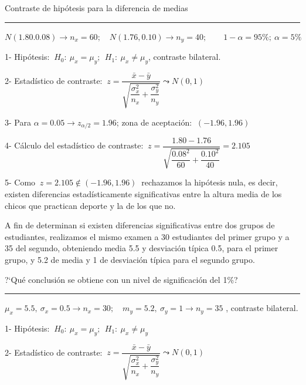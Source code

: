 \begin{myalertblock}{Contraste de hipótesis para la diferencia de medias}
\begin{example}
\rule{150pt}{0.1pt}

\vspace{2mm} $N(1.80.0.08) \to n_x=60;\quad N(1.76,0.10) \to n_y=40;\qquad 1-\alpha=95\%;\ \alpha=5\%$

\vspace{2mm} 1- Hipótesis: $\ H_0:\ \mu_x=\mu_y;\ \ H_1:\ \mu_x \neq \mu_y$, contraste bilateral.

\vspace{2mm} 2- Estadístico de contraste: $\ z=\dfrac{\bar x - \bar y}{\sqrt{\dfrac{\sigma^2_x}{n_x}+\dfrac{\sigma_y^2}{n_y}}} \leadsto N(0,1)$

\vspace{2mm} 3- Para $\alpha=0.05 \to z_{\alpha/2}=1.96$; zona de aceptación: $\ (-1.96,1.96)$

\vspace{2mm} 4- Cálculo del estadístico de contraste: $\ z=\dfrac{1.80-1.76}{\sqrt{\dfrac{0.08^2}{60}+\dfrac{0.10^2}{40}}}=2.105$

\vspace{2mm} 5-  Como $\ z=2.105 \notin (-1.96,1.96)\ $ rechazamos la hipótesis nula, es decir, existen diferencias estadísticamente significativas entre la altura media de los chicos que practican deporte y la de los que no.
\end{example}

	
	
\vspace{15mm}	
\begin{ejemplo}
\begin{ejre}
A fin de determinan si existen diferencias significativas entre dos grupos de estudiantes, realizamos el mismo examen a 30 estudiantes del primer grupo y a 35 del segundo, obteniendo media 5.5 y desviación típica 0.5, para el primer grupo, y 5.2 de media y 1 de desviación típica para el segundo grupo.

?`Qué conclusión se obtiene con un nivel de significación del 1\%?	

\rule{150pt}{0.1pt}

\vspace{2mm} $\mu_x=5.5,\ \sigma_x=0.5 \to n_x=30; \quad m_y=5.2,\ \sigma_y=1 \to n_y=35$ , contraste bilateral.

\vspace{2mm} 1- Hipótesis: $\ H_0:\ \mu_x=\mu_y;\ \ H_1:\ \mu_x \neq \mu_y$

\vspace{2mm} 2- Estadístico de contraste: $\ z=\dfrac{\bar x - \bar y }{\sqrt{\dfrac{\sigma^2_x}{n_x}+\dfrac{\sigma_y^2}{n_y}}} \leadsto N(0,1)$


\end{ejre}
\end{ejemplo}
\end{myalertblock}
